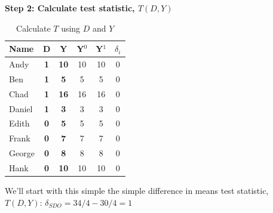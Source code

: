\documentclass[notes=show]{beamer}
\begin{document}
\begin{frame}[plain]

\begin{center}
\textbf{Step 2: Calculate test statistic, $T(D,Y)$}
\end{center}

\begin{table}[htbp]\centering
\begin{center}
\caption{Calculate $T$ using $D$ and $Y$}
\begin{threeparttable}
\begin{tabular}{lccccc}
\toprule
\multicolumn{1}{l}{Name}&
\multicolumn{1}{c}{D}&
\multicolumn{1}{c}{Y}&
\multicolumn{1}{c}{Y$^0$}&
\multicolumn{1}{c}{Y$^1$}&
\multicolumn{1}{c}{$\delta_i$}\\
\midrule
Andy		& \textbf{1} & \textbf{10}  & {10} & {10} & 0\\
Ben		& \textbf{1} & \textbf{5}    & {5} & {5} & 0 \\
Chad	& \textbf{1} & \textbf{16}  & {16} & {16} & 0 \\	
Daniel	& \textbf{1} &  \textbf{3}   & {3} & {3} & 0 \\
Edith		& \textbf{0} & \textbf{5}    & {5} & {5} & 0 \\
Frank	& \textbf{0} & \textbf{7}    & {7} & {7} & 0  \\
George	& \textbf{0} &\textbf {8}    & {8} & {8} & 0 \\
Hank		& \textbf{0} & \textbf{10}  & {10} & {10} & 0 \\
\bottomrule
\end{tabular}
\end{threeparttable}
\end{center}
\end{table}

We'll start with this simple the simple difference in means test statistic, $T(D,Y)$: $\delta_{SDO} = 34/4 - 30/4 = 1$	
\end{frame}
\end{document}
